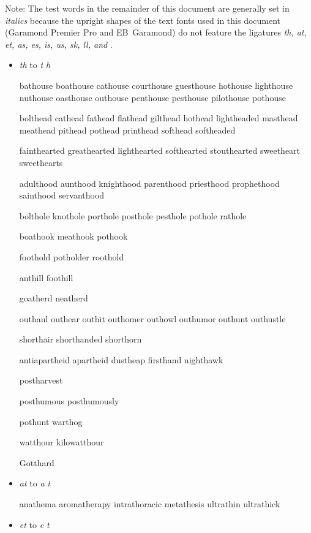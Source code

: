 \bigskip

Note: The test words in the remainder of this document are generally set in \emph{italics} because the upright shapes of the text fonts used in this document (Garamond Premier Pro and EB~Garamond) do not feature the ligatures \emph{th, at, et, as, {\ebg es}, is, us, {\ebg sk}, ll, and }.


\begin{itemize}

\item \emph{th} to \emph{t\kern0pt h}

\bgroup \em

bathouse boathouse cathouse courthouse guesthouse hothouse lighthouse nuthouse oasthouse outhouse penthouse pesthouse pilothouse pothouse

bolthead cathead fathead flathead gilthead hothead lightheaded masthead meathead pithead pothead printhead softhead softheaded

fainthearted greathearted lighthearted softhearted stouthearted sweetheart sweethearts

adulthood aunthood knighthood parenthood priesthood prophethood sainthood servanthood

bolthole knothole porthole posthole pesthole pothole rathole

boathook meathook pothook

foothold potholder roothold

anthill foothill

goatherd neatherd

outhaul outhear outhit outhomer outhowl outhumor outhunt outhustle

shorthair shorthanded shorthorn %

antiapartheid apartheid dustheap firsthand nighthawk

postharvest

posthumous posthumously 

pothunt warthog 

watthour kilowatthour

Gotthard

\egroup


\item \emph{at} to \emph{a\kern0pt t}

\bgroup \em

anathema aromatherapy intrathoracic metathesis ultrathin ultrathick 
\egroup


\item \emph{et} to \emph{e\kern0pt t}


\end{itemize}
